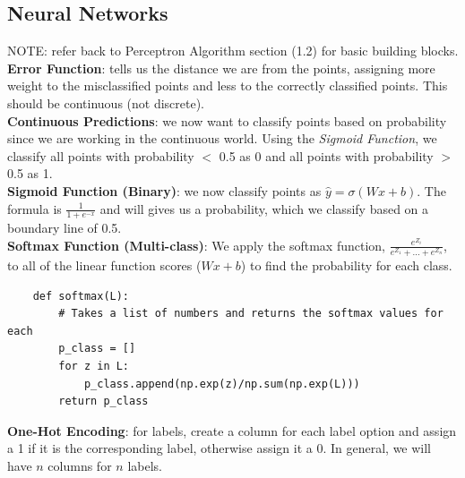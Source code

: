\documentclass[11pt, a4paper]{article}
\begin{document}
\begin{spacing}{1.1}
	\subsection{Neural Networks}
	NOTE: refer back to Perceptron Algorithm section (1.2) for basic building blocks. \vspace*{2mm}\\
	\textbf{Error Function}: tells us the distance we are from the points, assigning more weight to the misclassified points and less to the correctly classified points. This should be continuous (not discrete). \vspace*{2mm}\\
	\textbf{Continuous Predictions}: we now want to classify points based on probability since we are working in the continuous world. Using the \textit{Sigmoid Function}, we classify all points with probability $<$ 0.5 as 0 and all points with probability $>$ 0.5 as 1. \vspace*{2mm}\\
	\textbf{Sigmoid Function (Binary)}: we now classify points as $\hat{y} = \sigma(Wx+b)$. The formula is $\frac{1}{1+e^{-x}}$ and will gives us a probability, which we classify based on a boundary line of 0.5. \vspace*{2mm}\\
	\textbf{Softmax Function (Multi-class)}: We apply the softmax function, $\frac{e^{Z_i}}{e^{Z_1}+...+e^{Z_n}}$, to all of the linear function scores ($Wx+b$) to find the probability for each class.
	\begin{lstlisting}
	def softmax(L):
		# Takes a list of numbers and returns the softmax values for each
		p_class = []
		for z in L:
			p_class.append(np.exp(z)/np.sum(np.exp(L)))
		return p_class
	\end{lstlisting} \vspace*{2mm}
	\textbf{One-Hot Encoding}: for labels, create a column for each label option and assign a 1 if it is the corresponding label, otherwise assign it a 0. In general, we will have $n$ columns for $n$ labels.\vspace*{2mm}\\
	
	
	
	
	
	
	
	
	
	
	
	
	
\end{spacing}
\end{document}
